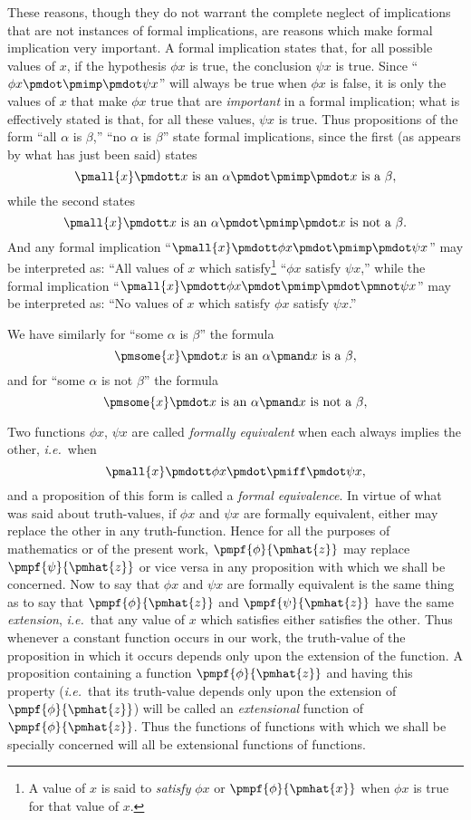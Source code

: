\documentclass[letterpaper,12pt,openany,leqno]{book}
\newcommand{\pagefirst}[1]{\marginnote[\boxed{\text{#1}}]{\boxed{\text{#1}}}}
\begin{document}
\pagefirst{22} These reasons, though they do not warrant the complete neglect of implications that are not instances of formal implications, are reasons which make formal implication very important. A formal implication states that, for all possible values of $x$, if the hypothesis $\phi x$ is true, the conclusion $\psi x$ is true. Since ``$\phi x \pmdot \pmimp \pmdot \psi x$'' will always be true when $\phi x$ is false, it is only the values of $x$ that make $\phi x$ true that are \textit{important} in a formal implication; what is effectively stated is that, for all these values, $\psi x$ is true. Thus propositions of the form ``all $\alpha$ is $\beta$,'' ``no $\alpha$ is $\beta$'' state formal implications, since the first (as appears by what has just been said) states 
\[
	\pmall{x}\pmdott x \text{ is an } \alpha \pmdot \pmimp \pmdot x \text{ is a } \beta,
\]
while the second states
\[
	\pmall{x}\pmdott x \text{ is an } \alpha \pmdot \pmimp \pmdot x \text{ is not a } \beta.
\]
And any formal implication ``$\pmall{x} \pmdott \phi x \pmdot \pmimp\pmdot \psi x$'' may be interpreted as: ``All values of $x$ which satisfy\footnote{A value of $x$ is said to \textit{satisfy} $\phi x$ or $\pmpf{\phi}{\pmhat{x}}$ when $\phi x$ is true for that value of $x$.} ``$\phi x$ satisfy $\psi x$,'' while the formal implication ``$\pmall{x}\pmdott\phi x \pmdot \pmimp \pmdot \pmnot \psi x$'' may be interpreted as: ``No values of $x$ which satisfy $\phi x$ satisfy $\psi x$.''

We have similarly for ``some $\alpha$ is $\beta$'' the formula
\[
	\pmsome{x}\pmdot x \text{ is an } \alpha \pmand x \text{ is a } \beta,
\]
and for ``some $\alpha$ is not $\beta$'' the formula
\[
	\pmsome{x}\pmdot x \text{ is an } \alpha \pmand x \text{ is not a } \beta,
\]

Two functions $\phi x$, $\psi x$ are called \textit{formally equivalent} when each always implies the other, \textit{i.e.}\ when
\[
	\pmall{x} \pmdott \phi x \pmdot \pmiff \pmdot \psi x,
\]
and a proposition of this form is called a \textit{formal equivalence}. In virtue of what was said about truth-values, if $\phi x$ and $\psi x$ are formally equivalent, either may replace the other in any truth-function. Hence for all the purposes of mathematics or of the present work, $\pmpf{\phi}{\pmhat{z}}$ may replace $\pmpf{\psi}{\pmhat{z}}$ or vice versa in any proposition with which we shall be concerned. Now to say that $\phi x$ and $\psi x$ are formally equivalent is the same thing as to say that $\pmpf{\phi}{\pmhat{z}}$ and $\pmpf{\psi}{\pmhat{z}}$ have the same \textit{extension}, \textit{i.e.}\ that any value of $x$ which satisfies either satisfies the other. Thus whenever a constant function occurs in our work, the truth-value of the proposition in which it occurs depends only upon the extension of the function. A proposition containing a function $\pmpf{\phi}{\pmhat{z}}$ and having this property (\textit{i.e.}\ that its truth-value depends only upon the extension of $\pmpf{\phi}{\pmhat{z}}$) will be called an \textit{extensional} function of $\pmpf{\phi}{\pmhat{z}}$. Thus the functions of functions with which we shall be specially concerned will all be extensional functions of functions.
\end{document}
